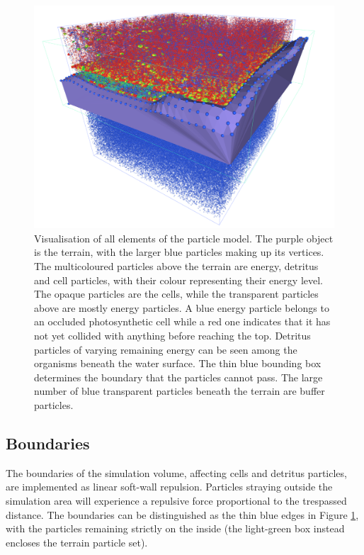 \begin{figure}
  \centering
  \includegraphics[width=\textwidth]{figure/boundaries}
  \caption{Visualisation of all elements of the particle model. The purple object is the terrain, with the larger blue particles making up its vertices. The multicoloured particles above the terrain are energy, detritus and cell particles, with their colour representing their energy level. The opaque particles are the cells, while the transparent particles above are mostly energy particles. A blue energy particle belongs to an occluded photosynthetic cell while a red one indicates that it has not yet collided with anything before reaching the top. Detritus particles of varying remaining energy can be seen among the organisms beneath the water surface. The thin blue bounding box determines the boundary that the particles cannot pass. The large number of blue transparent particles beneath the terrain are buffer particles.}
  \label{fig:boundaries} 
\end{figure}

\subsection{Boundaries}
The boundaries of the simulation volume, affecting cells and detritus particles, are implemented as linear soft-wall repulsion. Particles straying outside the simulation area will experience a repulsive force proportional to the trespassed distance. The boundaries can be distinguished as the thin blue edges in Figure \ref{fig:boundaries}, with the particles remaining strictly on the inside (the light-green box instead encloses the terrain particle set).

